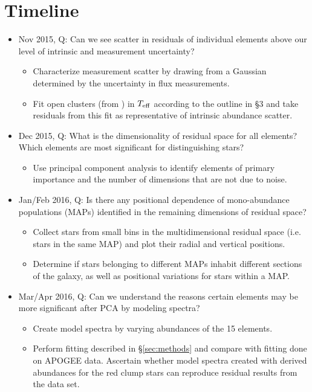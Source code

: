 \documentclass[preprint]{aastex}
\begin{document}
\section{Timeline}
\label{sec:timeline}

\begin{itemize}
\item Nov 2015, Q: Can we see scatter in residuals of individual elements above our level of intrinsic and measurement uncertainty?
\begin{itemize}
\item Characterize measurement scatter by drawing from a Gaussian determined by the uncertainty in flux measurements.
\item Fit open clusters (from \citealt{meszaros2015}) in $T_{\rm eff}$ according to the outline in \S3 and take residuals from this fit as representative of intrinsic abundance scatter.
\end{itemize}
\item Dec 2015, Q: What is the dimensionality of residual space for all elements? Which elements are most significant for distinguishing stars?
\begin{itemize}
\item Use principal component analysis to identify elements of primary importance and the number of dimensions that are not due to noise.
\end{itemize}
\item Jan/Feb 2016, Q: Is there any positional dependence of mono-abundance populations (MAPs) identified in the remaining dimensions of residual space?
\begin{itemize}
\item Collect stars from small bins in the multidimensional residual space (i.e. stars in the same MAP) and plot their radial and vertical positions.
\item Determine if stars belonging to different MAPs inhabit different sections of the galaxy, as well as positional variations for stars within a MAP.
\end{itemize}
\item Mar/Apr 2016, Q: Can we understand the reasons certain elements may be more significant after PCA by modeling spectra?
\begin{itemize}
\item Create model spectra by varying abundances of the 15 elements.
\item Perform fitting described in \S\ref{sec:methods} and compare with fitting done on APOGEE data. Ascertain whether model spectra created with derived abundances for the red clump stars can reproduce residual results from the data set.
\end{itemize}
\end{itemize}
\end{document}
